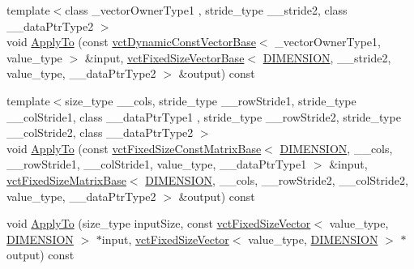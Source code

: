 \begin{DoxyCompactItemize}
\item 
{\footnotesize template$<$class \+\_\+vector\+Owner\+Type1 , stride\+\_\+type \+\_\+\+\_\+stride2, class \+\_\+\+\_\+data\+Ptr\+Type2 $>$ }\\void \hyperlink{classvct_frame_base_aeed92210c8340f7f91c7b876c01da974}{Apply\+To} (const \hyperlink{classvct_dynamic_const_vector_base}{vct\+Dynamic\+Const\+Vector\+Base}$<$ \+\_\+vector\+Owner\+Type1, value\+\_\+type $>$ \&input, \hyperlink{classvct_fixed_size_vector_base}{vct\+Fixed\+Size\+Vector\+Base}$<$ \hyperlink{classvct_frame_base_a4284a4e875533c13df90a20c0233e043ad25b85efd5e4c2687ddf38ae18cd88f0}{D\+I\+M\+E\+N\+S\+I\+O\+N}, \+\_\+\+\_\+stride2, value\+\_\+type, \+\_\+\+\_\+data\+Ptr\+Type2 $>$ \&output) const 
\item 
{\footnotesize template$<$size\+\_\+type \+\_\+\+\_\+cols, stride\+\_\+type \+\_\+\+\_\+row\+Stride1, stride\+\_\+type \+\_\+\+\_\+col\+Stride1, class \+\_\+\+\_\+data\+Ptr\+Type1 , stride\+\_\+type \+\_\+\+\_\+row\+Stride2, stride\+\_\+type \+\_\+\+\_\+col\+Stride2, class \+\_\+\+\_\+data\+Ptr\+Type2 $>$ }\\void \hyperlink{classvct_frame_base_a2c82a5452d057939840e8ae9aa2979a4}{Apply\+To} (const \hyperlink{classvct_fixed_size_const_matrix_base}{vct\+Fixed\+Size\+Const\+Matrix\+Base}$<$ \hyperlink{classvct_frame_base_a4284a4e875533c13df90a20c0233e043ad25b85efd5e4c2687ddf38ae18cd88f0}{D\+I\+M\+E\+N\+S\+I\+O\+N}, \+\_\+\+\_\+cols, \+\_\+\+\_\+row\+Stride1, \+\_\+\+\_\+col\+Stride1, value\+\_\+type, \+\_\+\+\_\+data\+Ptr\+Type1 $>$ \&input, \hyperlink{classvct_fixed_size_matrix_base}{vct\+Fixed\+Size\+Matrix\+Base}$<$ \hyperlink{classvct_frame_base_a4284a4e875533c13df90a20c0233e043ad25b85efd5e4c2687ddf38ae18cd88f0}{D\+I\+M\+E\+N\+S\+I\+O\+N}, \+\_\+\+\_\+cols, \+\_\+\+\_\+row\+Stride2, \+\_\+\+\_\+col\+Stride2, value\+\_\+type, \+\_\+\+\_\+data\+Ptr\+Type2 $>$ \&output) const 
\item 
void \hyperlink{classvct_frame_base_a31e0a2a5e96c33cb9fb7cf9f54e0b856}{Apply\+To} (size\+\_\+type input\+Size, const \hyperlink{classvct_fixed_size_vector}{vct\+Fixed\+Size\+Vector}$<$ value\+\_\+type, \hyperlink{classvct_frame_base_a4284a4e875533c13df90a20c0233e043ad25b85efd5e4c2687ddf38ae18cd88f0}{D\+I\+M\+E\+N\+S\+I\+O\+N} $>$ $\ast$input, \hyperlink{classvct_fixed_size_vector}{vct\+Fixed\+Size\+Vector}$<$ value\+\_\+type, \hyperlink{classvct_frame_base_a4284a4e875533c13df90a20c0233e043ad25b85efd5e4c2687ddf38ae18cd88f0}{D\+I\+M\+E\+N\+S\+I\+O\+N} $>$ $\ast$output) const 
\item 

\end{DoxyCompactItemize}
